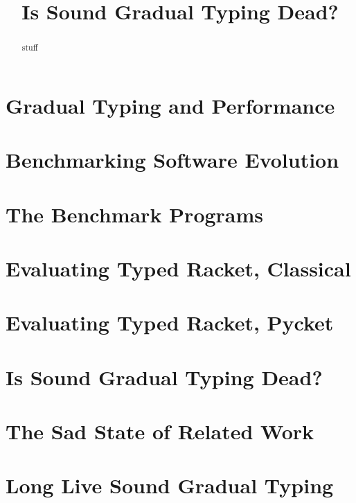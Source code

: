 \documentclass[preprint,10pt,english]{sigplanconf}
\title{Is Sound Gradual Typing Dead?}
\begin{document}
\setlength{\pdfpageheight}{\paperheight}
\setlength{\pdfpagewidth}{\paperwidth}


\maketitle

\begin{abstract}
stuff 
\end{abstract}

\section{Gradual Typing and Performance}     \label{sec:intro} 
\section{Benchmarking Software Evolution}    \label{sec:fwk}   
\section{The Benchmark Programs}             \label{sec:bm}    
\section{Evaluating Typed Racket, Classical} \label{sec:tr}    
\section{Evaluating Typed Racket, Pycket}    \label{sec:trp}   
\section{Is Sound Gradual Typing Dead?}      \label{sec:death} 
\section{The Sad State of Related Work}      \label{sec:rel}   
\section{Long Live Sound Gradual Typing}     \label{sec:fut}   




\end{document}
